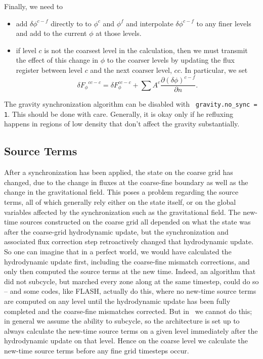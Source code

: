 \begin{itemize}
Finally, we need to
\begin{itemize}
\item add $\delta \phi^{c-f}$ directly to 
to $\phi^{c}$ and $\phi^{f}$ and interpolate $\delta \phi^{c-f}$ to any finer
levels and add to the current $\phi$ at those levels.

\item if level $c$ is not the coarsest level in the calculation, then we must transmit the
effect of this change in $\phi$ to the coarser levels by updating the flux register between
level $c$ and the next coarser level, $cc.$ In particular, we set
\begin{equation}
\delta {F_\phi}^{cc-c} = \delta F_\phi^{cc-c} 
+ \sum A^c \frac{\partial (\delta \phi)^{c-f}}{\partial n}  .
\end{equation}
\end{itemize}

The gravity synchronization algorithm can be disabled with {\tt
  gravity.no\_sync = 1}.  This should be done with care.  Generally,
it is okay only if he refluxing happens in regions of low density that
don't affect the gravity substantially.

\end{itemize}

\subsection{Source Terms}
\label{sec:synchronization_sources}

After a synchronization has been applied, the state on the coarse grid
has changed, due to the change in fluxes at the coarse-fine boundary as
well as the change in the gravitational field. This poses a problem
regarding the source terms, all of which generally rely either on the
state itself, or on the global variables affected by the synchronization
such as the gravitational field. The new-time sources constructed on the
coarse grid all depended on what the state was after the coarse-grid
hydrodynamic update, but the synchronization and associated flux
correction step retroactively changed that hydrodynamic update. So one
can imagine that in a perfect world, we would have calculated the
hydrodynamic update first, including the coarse-fine mismatch
corrections, and only then computed the source terms at the new time.
Indeed, an algorithm that did not subcycle, but marched every zone along
at the same timestep, could do so -- and some codes, like FLASH,
actually do this, where no new-time source terms are computed on any
level until the hydrodynamic update has been fully completed and the
coarse-fine mismatches corrected. But in \castro\ we cannot do this; in
general we assume the ability to subcycle, so the architecture is set up
to always calculate the new-time source terms on a given level
immediately after the hydrodynamic update on that level. Hence on the
coarse level we calculate the new-time source terms before any fine grid
timesteps occur.


